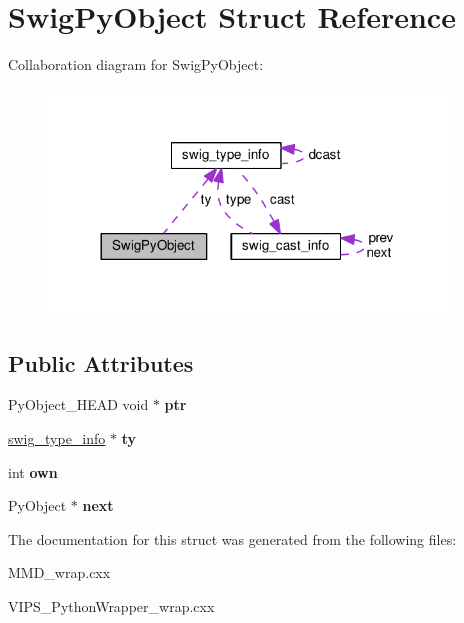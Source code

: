 \hypertarget{structSwigPyObject}{}\section{Swig\+Py\+Object Struct Reference}
\label{structSwigPyObject}


Collaboration diagram for Swig\+Py\+Object\+:
\nopagebreak
\begin{figure}[H]
\begin{center}
\leavevmode
\includegraphics[width=300pt]{structSwigPyObject__coll__graph}
\end{center}
\end{figure}
\subsection*{Public Attributes}
\begin{DoxyCompactItemize}
\item 
Py\+Object\+\_\+\+H\+E\+AD void $\ast$ {\bfseries ptr}\hypertarget{structSwigPyObject_a96e168de04fa2da0125cf00f26ea6b9c}{}\label{structSwigPyObject_a96e168de04fa2da0125cf00f26ea6b9c}

\item 
\hyperlink{structswig__type__info}{swig\+\_\+type\+\_\+info} $\ast$ {\bfseries ty}\hypertarget{structSwigPyObject_a77f6f8357ce9c50f7c18c2a4ea72ea62}{}\label{structSwigPyObject_a77f6f8357ce9c50f7c18c2a4ea72ea62}

\item 
int {\bfseries own}\hypertarget{structSwigPyObject_a83cb6489fb1b171467f06c091ae6f283}{}\label{structSwigPyObject_a83cb6489fb1b171467f06c091ae6f283}

\item 
Py\+Object $\ast$ {\bfseries next}\hypertarget{structSwigPyObject_a6d423675e9561f658562d3d24f4f70d0}{}\label{structSwigPyObject_a6d423675e9561f658562d3d24f4f70d0}

\end{DoxyCompactItemize}


The documentation for this struct was generated from the following files\+:\begin{DoxyCompactItemize}
\item 
M\+M\+D\+\_\+wrap.\+cxx\item 
V\+I\+P\+S\+\_\+\+Python\+Wrapper\+\_\+wrap.\+cxx\end{DoxyCompactItemize}
